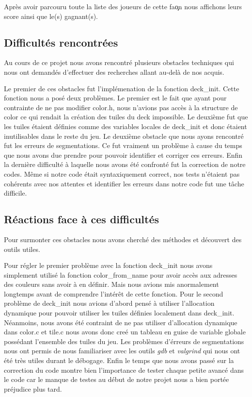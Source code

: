 \documentclass[12pt,a4paper]{extarticle}
\begin{document}
    Apr\`es avoir parcouru toute la liste des joueurs de cette fa\c on nous affichons leurs score ainsi que le(s) gagnant(s).

    \subsection{Difficult\'es  rencontr\'ees}
    Au cours de ce projet nous avons rencontr\'e plusieurs obstacles techniques qui nous ont demand\'es d'effectuer 
    des recherches allant au-del\`a de nos acquis.
    
    Le premier de ces obstacles fut l'impl\'emenation de la fonction deck\_init. Cette fonction nous a pos\'e deux probl\`emes. 
    Le premier est le fait que ayant pour contrainte de ne pas modifier color.h, nous n'avions pas acc\`es \`a la structure 
    de color ce qui rendait la cr\'eation des tuiles du deck impossible. Le deuxi\`eme fut que les tuiles \'etaient d\'efinies
     comme des variables locales de deck\_init et donc \'etaient inutilisables dans le reste du jeu.
    \newline
    Le deuxi\`eme obstacle que nous ayons rencontr\'e fut les erreurs de segmentations. Ce fut vraiment un probl\`eme \`a cause 
    du temps que nous avons due prendre pour pouvoir identifier et corriger ces erreurs.
    \newline
    Enfin la derni\`ere difficult\'e \`a laquelle nous avons \'et\'e confront\'e fut la correction de notre codes. M\^eme si notre code 
    \'etait syntaxiquement correct, nos tests n'\'etaient pas coh\'erents avec nos attentes et identifier les erreurs dans notre 
    code fut une t\^ache difficile.
    \subsection{R\'eactions face \`a ces difficult\'es}
	Pour surmonter ces obstacles nous avons cherch\'e des m\'ethodes et d\'ecouvert des outils utiles.
    
    Pour r\'egler le premier probl\`eme avec la fonction deck\_init nous avons simplement utilis\'e la fonction color\_from\_name
     pour avoir acc\`es aux adresses des couleurs sans avoir \`a en d\'efinir. Mais nous avions mis anormalement longtemps avant 
     de comprendre l'int\'er\^et de cette fonction.
    Pour le second probl\`eme de deck\_init nous avions d'abord pens\'e \`a utiliser l'allocation dynamique pour pouvoir utiliser 
    les tuiles d\'efinies localement dans deck\_init. N\'eanmoins, nous avons \'et\'e contraint de ne pas utiliser d'allocation dynamique 
    dans color.c et tile.c nous avons donc cre\'e un tableau en guise de variable globale poss\'edant l'ensemble des tuiles du jeu. 
    \newline
    Les probl\`emes d'\'erreurs de segmentations nous ont permis de nous familiariser avec les outils \emph{gdb} et \emph{valgrind} qui nous 
    ont \'et\'e tr\`es utiles durant le d\'ebogage.
    \newline
    Enfin le temps que nous avons pass\'e sur la correction du code montre bien l'importance de tester chaque petite avanc\'e 
    dans le code car le manque de testes au d\'ebut de notre projet nous a bien port\'ee pr\'ejudice plus tard.
\end{document}

